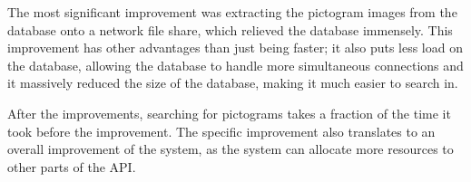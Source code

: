The most significant improvement was extracting the pictogram images from the database onto a network file share, which relieved the database immensely. This improvement has other advantages than just being faster; it also puts less load on the database, allowing the database to handle more simultaneous connections and it massively reduced the size of the database, making it much easier to search in.

After the improvements, searching for pictograms takes a fraction of the time it took before the improvement. The specific improvement also translates to an overall improvement of the system, as the system can allocate more resources to other parts of the API.